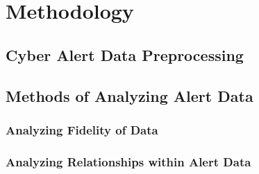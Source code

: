 %
%
%

\chapter{Methodology}

\section{Cyber Alert Data Preprocessing}

\section{Methods of Analyzing Alert Data}

\subsection{Analyzing Fidelity of Data}

\subsection{Analyzing Relationships within Alert Data}
